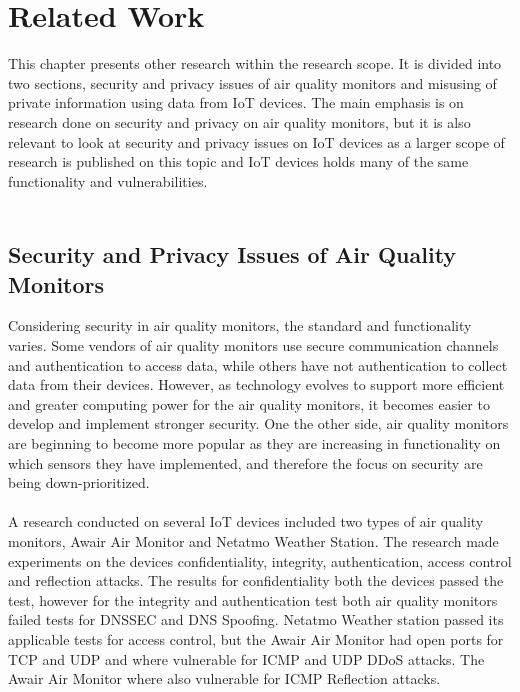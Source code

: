 \chapter*{Related Work}
This chapter presents other research within the research scope. It is divided into two sections, security and privacy issues of air quality monitors and misusing of private information using data from IoT devices. The main emphasis is on research done on security and privacy on air quality monitors, but it is also relevant to look at security and privacy issues on IoT devices as a larger scope of research is published on this topic and IoT devices holds many of the same functionality and vulnerabilities.\\\\
\section*{Security and Privacy Issues of Air Quality Monitors}
Considering security in air quality monitors, the standard and functionality varies. \cite{AQMHowFarFunctionality} Some vendors of air quality monitors use secure communication channels and authentication to access data, while others have not authentication to collect data from their devices. However, as technology evolves to support more efficient and greater computing power for the air quality monitors, it becomes easier to develop and implement stronger security. One the other side, air quality monitors are beginning to become more popular as they are increasing in functionality on which sensors they have implemented, and therefore the focus on security are being down-prioritized.\\\\
\cite{SecurityAndDataIntInAQM} 
A research conducted on several IoT devices included two types of air quality monitors, Awair Air Monitor and Netatmo Weather Station. \cite{IoTSecurityandPrivacyImpl} The research made experiments on the devices confidentiality, integrity, authentication, access control and reflection attacks. The results for confidentiality both the devices passed the test, however for the integrity and authentication test both air quality monitors failed tests for DNSSEC and DNS Spoofing. Netatmo Weather station passed its applicable tests for access control, but the Awair Air Monitor had open ports for TCP and UDP and where vulnerable for ICMP and UDP DDoS attacks. The Awair Air Monitor where also vulnerable for ICMP Reflection attacks. \cite{IoTSecurityandPrivacyImpl}
